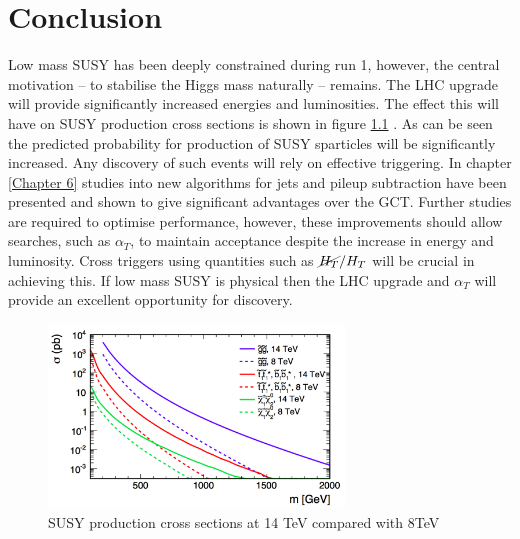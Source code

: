 
\chapter{Conclusion} %

\label{Chapter7} %



Low mass SUSY has been deeply constrained during run 1, however, the central motivation -- to stabilise the Higgs mass naturally -- remains. The LHC upgrade will provide significantly increased energies and luminosities. The effect this will have on SUSY production cross sections is shown in figure \ref{snow} \cite{ProjectedCx}. As can be seen the predicted probability for production of SUSY sparticles will be significantly increased. Any discovery of such events will rely on effective triggering. In chapter \ref{Chapter 6} studies into new algorithms for jets and pileup subtraction have been presented and shown to give significant advantages over the GCT. Further studies are required to optimise performance, however, these improvements should allow searches, such as $\alpha_T$, to maintain acceptance despite the increase in energy and luminosity. Cross triggers using quantities such as $\cancel{H_T}/{H_T}$ will be crucial in achieving this. If low mass SUSY is physical then the LHC upgrade and $\alpha_T$ will provide an excellent opportunity for discovery. 
\begin{figure}
\centering
    \includegraphics[width=0.7\textwidth]{Figures/snowmass.png}
  \caption{SUSY production cross sections at 14 TeV compared with 8TeV}
  \label{snow}
\end{figure}


